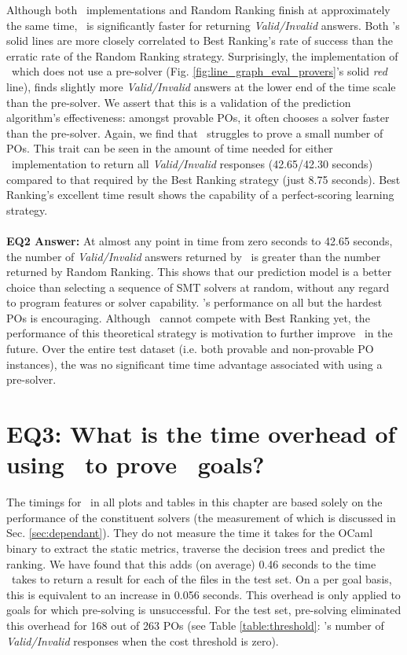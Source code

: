 Although both \where~implementations and \textsf{Random Ranking} finish at approximately the same time, \where~is significantly faster for returning \textit{Valid/Invalid} answers. 
Both \where's solid lines are more closely correlated to \textsf{Best Ranking}'s rate of success than the erratic rate of the \textsf{Random Ranking} strategy.
Surprisingly, the implementation of \where~which does not use a pre-solver (Fig. \ref{fig:line_graph_eval_provers}'s solid \textit{red} line), finds slightly more \textit{Valid/Invalid} answers  at the lower end of the time scale than the pre-solver.  
We assert that this is a validation of the prediction algorithm's effectiveness: amongst provable POs, it often chooses a solver faster than the pre-solver.
Again, we find that \where~struggles to prove a small number of POs.
This trait can be seen in the amount of time needed for either \where~implementation to return all \textit{Valid/Invalid} responses (42.65/42.30 seconds) compared to that required by the \textsf{Best Ranking} strategy (just 8.75 seconds). 
\textsf{Best Ranking}'s excellent time result shows the capability of a perfect-scoring learning strategy. \\
\\
\textbf{EQ2 Answer:} At almost any point in time from zero seconds to 42.65 seconds, the number of \textit{Valid/Invalid} answers returned by \where~is greater than the number returned by \textsf{Random Ranking}.
This shows that our prediction model is a better choice than selecting a sequence of SMT solvers at random, without any regard to program features or solver capability.
\where's performance on all but the hardest POs is encouraging.
Although \where~cannot compete with \textsf{Best Ranking} yet, the performance of this theoretical strategy is motivation to further improve \where~in the future.
Over the entire test dataset (i.e. both provable and non-provable PO instances), the was no significant time time advantage associated with using a pre-solver.   



\section{EQ3: What is the time overhead of using \where~to prove \why~goals?}

\label{sec:eq3}

The timings for \where~in all plots and tables in this chapter are based solely on the performance of the constituent solvers (the measurement of which is discussed in Sec. \ref{sec:dependant}). They do not measure the time it takes for the OCaml binary to extract the static metrics, traverse the decision trees and predict the ranking. 
We have found that this adds (on average) 0.46 seconds to the time \where~takes to return a result for each of the files in the test set. 
On a per goal basis, this is equivalent to an increase in 0.056 seconds.
This overhead is only applied to goals for which pre-solving is unsuccessful.  
For the test set, pre-solving eliminated this overhead for 168 out of 263 POs (see Table \ref{table:threshold}: \where's number of \textit{Valid/Invalid} responses when the cost threshold is zero).

